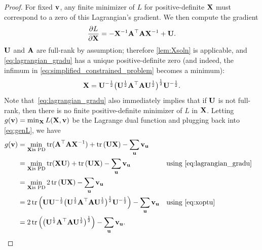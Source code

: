 \begin{proof}
For fixed $\mathbf{v}$, any finite minimizer of $L$ for positive-definite $\mathbf{X}$ must correspond to a zero of this Lagrangian's gradient. We then compute the gradient
\begin{equation}\label{eq:lagrangian_gradu}
  \frac{\partial L}{\partial \mathbf{X}} = -\mathbf{X}^{-1} \mathbf{A}^\top\mathbf{A} \mathbf{X}^{-1} + \mathbf{U}.
\end{equation}
$\mathbf{U}$ and $\mathbf{A}$ are full-rank by assumption; therefore \cref{lem:Xsoln} is applicable, and \cref{eq:lagrangian_gradu} has a unique positive-definite zero (and indeed, the infimum in \cref{eq:simplified_constrained_problem} becomes a minimum):
\begin{equation}\label{eq:xoptu}
\mathbf{X} = \mathbf{U}^{-\frac{1}{2}} \big(\mathbf{U}^\frac{1}{2} \mathbf{A}^\top\mathbf{A} \mathbf{U}^\frac{1}{2} \big)^\frac{1}{2} \mathbf{U}^{-\frac{1}{2}}.
\end{equation}
Note that~\cref{eq:lagrangian_gradu} also immediately implies that if $\mathbf{U}$ is not full-rank, then there is no finite positive-definite minimizer of $L$ in $\mathbf{X}$. Letting $g(\mathbf{v}) = \min_{\mathbf{X}} L(\mathbf{X}, \mathbf{v})$ be the Lagrange dual function and plugging back into \cref{eq:genL}, we have 
\begin{align*}
g(\dualv) 
 &= \min_{\bfX \text{is PD}} \tr(\AAT\bfX^{-1})
      + \tr \left( \bfU \bfX \right) - \sum_\contrib \dualv_\contrib \\
 &= \min_{\bfX \text{is PD}} \tr(\bfX \bfU)
      + \tr \left( \bfU \bfX \right) - \sum_\contrib \dualv_\contrib 
      && \text{using \cref{eq:lagrangian_gradu}}\\
 &=  \min_{\bfX \text{is PD}} 2\,\tr \left( \bfU \bfX \right) - \sum_\contrib \dualv_\contrib \\      
 &=  2\,\tr \left( \bfU \bfU\nhlf \big(\bfU\hlf \AAT \bfU\hlf \big)\hlf \bfU\nhlf \right) - \sum_\contrib \dualv_\contrib
      && \text{using \cref{eq:xoptu}} \\
 &=  2\,\tr \left( \big(\bfU\hlf \AAT \bfU\hlf \big)\hlf \right) - \sum_\contrib \dualv_\contrib.
\end{align*}
\end{proof}

